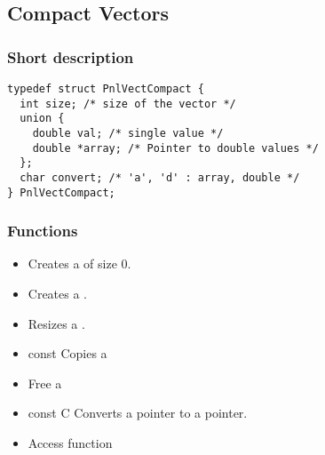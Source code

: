\subsection{Compact Vectors}
\subsubsection{Short description}

\begin{verbatim}
typedef struct PnlVectCompact {
  int size; /* size of the vector */
  union {
    double val; /* single value */
    double *array; /* Pointer to double values */
  };
  char convert; /* 'a', 'd' : array, double */
} PnlVectCompact;
\end{verbatim}

\subsubsection{Functions}

\begin{itemize}
  \item {}
  \sshortdescribe Creates a  of size 0.  

\item {}
  \sshortdescribe Creates a .  

\item {} 
  \sshortdescribe Resizes a .  

\item {} {const \ptr {}}
  \sshortdescribe Copies a   

\item {}
  \sshortdescribe Free a   

\item {}
  {const  \ptr C} 
  \sshortdescribe Converts a  pointer to a  pointer.  

\item {}
  \sshortdescribe Access function  
\end{itemize}


